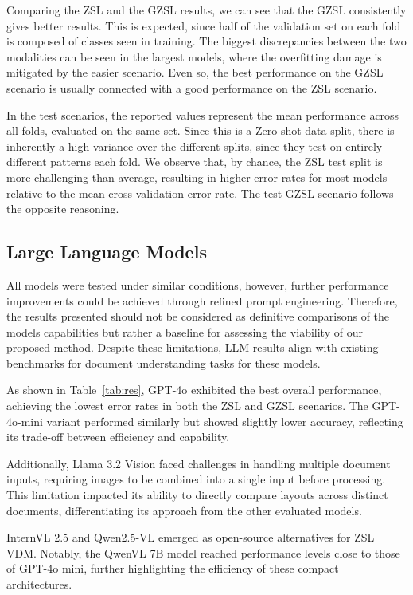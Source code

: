 Comparing the \gls{ZSL} and the \gls{GZSL} results, we can see that the \gls{GZSL} consistently gives better results. This is expected, since half of the validation set on each fold is composed of classes seen in training. The biggest discrepancies between the two modalities can be seen in the largest models, where the overfitting damage is mitigated by the easier scenario. Even so, the best performance on the \gls{GZSL} scenario is usually connected with a good performance on the \gls{ZSL} scenario.

In the test scenarios, the reported values represent the mean performance across all folds, evaluated on the same set. Since this is a Zero-shot data split, there is inherently a high variance over the different splits, since they test on entirely different patterns each fold. We observe that, by chance, the \gls{ZSL} test split is more challenging than average, resulting in higher error rates for most models relative to the mean cross-validation error rate. The test \gls{GZSL} scenario follows the opposite reasoning.

\subsection{Large Language Models}
\label{sec:llm_result}

All models were tested under similar conditions, however, further performance improvements could be achieved through refined prompt engineering. Therefore, the results presented should not be considered as definitive comparisons of the models capabilities but rather a baseline for assessing the viability of our proposed method. Despite these limitations, \gls{LLM} results align with existing benchmarks for document understanding tasks for these models. 

As shown in Table~\ref{tab:res}, GPT-4o exhibited the best overall performance, achieving the lowest error rates in both the \gls{ZSL} and \gls{GZSL} scenarios. The GPT-4o-mini variant performed similarly but showed slightly lower accuracy, reflecting its trade-off between efficiency and capability.

Additionally, Llama 3.2 Vision faced challenges in handling multiple document inputs, requiring images to be combined into a single input before processing. This limitation impacted its ability to directly compare layouts across distinct documents, differentiating its approach from the other evaluated models.

InternVL 2.5 and Qwen2.5-VL emerged as open-source alternatives for  \gls{ZSL} \gls{VDM}. Notably, the QwenVL 7B model reached performance levels close to those of GPT-4o mini, further highlighting the efficiency of these compact architectures.

